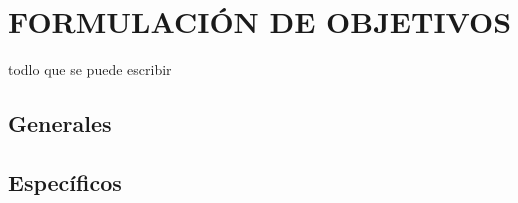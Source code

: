 \chapter{FORMULACIÓN DE OBJETIVOS}


todlo que se puede escribir
\section{Generales}



\section{Específicos}

